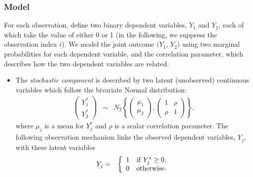 \documentclass{article}
\begin{document}
\subsubsection{Model}

For each observation, define two binary dependent variables, $Y_1$ and
$Y_2$, each of which take the value of either 0 or 1 (in the
following, we suppress the observation index $i$).  We model the joint
outcome $(Y_1$, $Y_2)$ using two marginal probabilities for each
dependent variable, and the correlation parameter, which describes how
the two dependent variables are related. 

\begin{itemize}
\item The \emph{stochastic component} is described by two latent (unobserved)
  continuous variables which follow the bivariate Normal distribution:
\begin{eqnarray*}
  \left ( \begin{array}{c} 
      Y_1^* \\
      Y_2^* 
    \end{array}
  \right ) &\sim &  
  N_2 \left \{ \left ( 
      \begin{array}{c}
        \mu_1 \\ \mu_2
      \end{array} \right ), \left( \begin{array}{cc}
                 1 & \rho \\
                 \rho & 1 
                 \end{array} \right) \right\},
\end{eqnarray*}
where $\mu_j$ is a mean for $Y_j^*$ and $\rho$ is a scalar correlation
parameter. The following observation mechanism links the observed
dependent variables, $Y_j$, with these latent variables
\begin{eqnarray*}
Y_j & = & \left \{ \begin{array}{cc}
                   1 & {\rm if} \; Y_j^* \ge 0, \\
                   0 & {\rm otherwise.}
                   \end{array} 
                   \right.
\end{eqnarray*}



\end{itemize}
\end{document}
